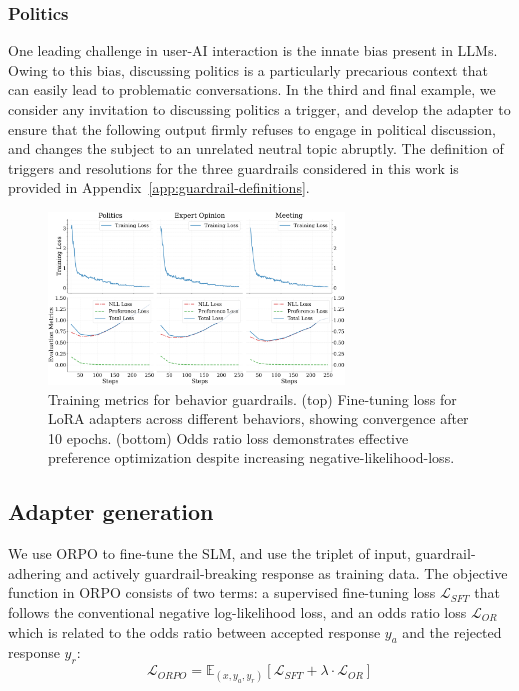 \documentclass[letterpaper]{article}
\begin{document}
\subsubsection{Politics}
One leading challenge in user-AI interaction is the innate bias present in LLMs. Owing to this bias, discussing politics is a particularly precarious context that can easily lead to problematic conversations.
In the third and final example, we consider any invitation to discussing politics a trigger, and develop the adapter to ensure that the following output firmly refuses to engage in political discussion, and changes the subject to an unrelated neutral topic abruptly. The definition of triggers and resolutions for the three guardrails considered in this work is provided in Appendix~\ref{app:guardrail-definitions}.
\begin{figure}[!ht]
	\centering
	\includegraphics[width=0.7\textwidth]{figures/training_eval_metrics_comparison.png}
	\caption{Training metrics for behavior guardrails. (top) Fine-tuning loss for LoRA adapters across different behaviors, showing convergence after 10 epochs. (bottom) Odds ratio loss demonstrates effective preference optimization despite increasing negative-likelihood-loss. }\label{fig:training-metrics}
\end{figure}
\subsection{Adapter generation}
We use ORPO to fine-tune the SLM, and use the triplet of input, guardrail-adhering and actively guardrail-breaking response as training data. The objective function in ORPO consists of two terms: a supervised fine-tuning loss $\mathcal{L}_{SFT}$ that follows the conventional negative log-likelihood loss, and an odds ratio loss $\mathcal{L}_{OR}$ which is related to the odds ratio between accepted response $y_a$ and the rejected response $y_r$:
\begin{equation}
	\mathcal{L}_{ORPO} = \mathbb{E}_{(x,y_a,y_r)} [\mathcal{L}_{SFT} + \lambda \cdot \mathcal{L}_{OR}]
\end{equation}
\end{document}
